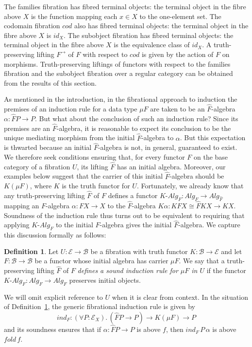 \documentclass{LMCS}
\newcommand{\ra}{\rightarrow}
\newcommand\E{{\mathcal E}}
\newcommand\B{{\mathcal B}}
\newcommand\alg{\mathit{Alg}}
\newcommand\dalg{\mbox{-}\!\alg}
\theoremstyle{plain}
\theoremstyle{remark}
\theoremstyle{definition}
\newtheorem{definition}[theorem]{Definition}
\begin{document}
The families fibration has fibred terminal objects: the terminal
object in the fibre above $X$ is the function mapping each $x \in X$
to the one-element set. The codomain fibration $\mathit{cod}$ also has
fibred terminal objects: the terminal object in the fibre above $X$ is
$\mathit{id}_X$. The subobject fibration has fibred terminal objects:
the terminal object in the fibre above $X$ is the equivalence class of
$\mathit{id}_X$.  A truth-preserving lifting $F^{\to}$ of $F$ with
respect to $\mathit{cod}$ is given by the action of $F$ on morphisms.
Truth-preserving liftings of functors with respect to the families
fibration and the subobject fibration over a regular category can be
obtained from the results of this section.

As mentioned in the introduction, in the fibrational approach to
induction the premises of an induction rule for a data type $\mu F$
are taken to be an $\hat{F}$-algebra $\alpha:\hat{F}P \ra P$. But what
about the conclusion of such an induction rule? Since its premises are
an $\hat{F}$-algebra, it is reasonable to expect its conclusion to be
the unique mediating morphism from the initial $\hat{F}$-algebra to
$\alpha$.  But this expectation is thwarted because an initial
$\hat{F}$-algebra is not, in general, guaranteed to exist. We
therefore seek conditions ensuring that, for every functor $F$ on the
base category of a fibration $U$, its lifting $\hat{F}$ has an initial
algebra. Moreover, our examples below suggest that the carrier of this
initial $\hat{F}$-algebra should be $K(\mu F)$, where $K$ is the truth
functor for $U$.  Fortunately, we already know that any
truth-preserving lifting $\hat{F}$ of $F$ defines a functor $K\dalg_F
:\alg_F\to\alg_{\hat F}$ mapping an $F$-algebra $\alpha : FX
\rightarrow X$ to the $\hat F$-algebra $K\alpha : KFX \cong \hat F KX
\ra KX$.  Soundness of the induction rule thus turns out to be
equivalent to requiring that applying $K\dalg_F$ to the initial
$F$-algebra gives the initial $\hat{F}$-algebra. We capture this
discussion formally as follows:

\begin{definition}\label{def:ind}
  Let $U:\E\to\B$ be a fibration with truth functor $K:\B\to\E$ and
  let $F:\B\to\B$ be a functor whose initial algebra has carrier $\mu
  F$. We say that a truth-preserving lifting $\hat F$ of $F$
  \emph{defines a sound induction rule for $\mu F$ in $U$} if the
  functor $K\dalg_F :\alg_F\to\alg_{\hat F}$ preserves initial objects.
\end{definition}
\noindent
We will omit explicit reference to $U$ when it is clear from context.
In the situation of Definition~\ref{def:ind}, the generic fibrational
induction rule is given by
\[\mathit{ind}_F : (\forall P: \E_X).\, (\hat{F} P \ra P) \ra K(\mu F) \ra P \]
and its soundness ensures that if $\alpha:\hat{F} P \ra P$ is above
$f$, then $\mathit{ind}_F \,P\, \alpha$ is above $\mathit{fold} \, f$.
\end{document}

